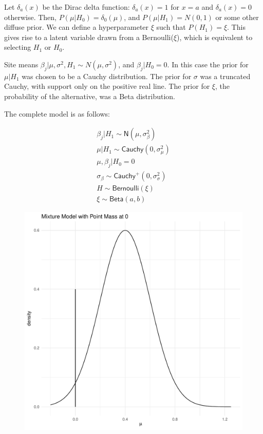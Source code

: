 \documentclass[AMA,STIX1COL]{WileyNJD-v2}\usepackage[]{graphicx}\usepackage[]{color}
\makeatletter
\def\maxwidth{ %
  \ifdim\Gin@nat@width>\linewidth
    \linewidth
  \else
    \Gin@nat@width
  \fi
}
\newenvironment{knitrout}{}{} %
\makeatother
\begin{document}
Let $\delta_a(x)$ be the Dirac delta function: $\delta_a(x) = 1$ for $x = a$ and $\delta_a(x)=0$ otherwise. Then, $P( \mu|H_0) = \delta_0 ( \mu )$,  and $P( \mu|H_1) = N(0,1)$ or some other diffuse prior. We can define a hyperparameter $\xi$ such that $P(H_1) = \xi$. This gives rise to a latent variable drawn from a Bernoulli($\xi$), which is equivalent to selecting $H_1$ or $H_0$.

Site means $\beta_{j}|\mu, \sigma^2,H_1 \sim N(\mu, \sigma^2)$, and $\beta_{j}|H_0 = 0$. In this case the prior for  $\mu| H_1$ was chosen to be a Cauchy distribution. The prior for $\sigma$ was a truncated Cauchy, with support only on the positive real line. The prior for $\xi$, the probability of the alternative, was a Beta distribution. 

The complete model is as follows:

\begin{gather}\label{eq3}
\beta_{j}|H_ 1 \sim \textsf{N}(\mu, \sigma_{\beta}^{2}) \\
\mu|H_1\sim \textsf{Cauchy}(0,\sigma_{\mu}^{2})\\
\mu, \beta_{j}|H_0  =0\\
\sigma_{\beta}\sim \textsf{Cauchy}^+(0,\sigma_{\sigma}^{2})\\
H\sim \textsf{Bernoulli}(\xi)\\
\xi \sim \textsf{Beta}(a, b)
\end{gather}




\begin{figure}
\begin{knitrout}
\color{fgcolor}
\includegraphics[width=\maxwidth]{figure/unnamed-chunk-3-1} 

\end{knitrout}
\end{figure}
\end{document}
